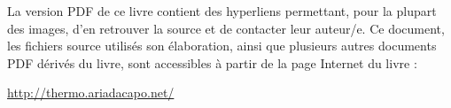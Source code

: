 {	La version PDF de ce livre contient des hyperliens permettant, pour la plupart des images, d’en retrouver la source et de contacter leur auteur/e. Ce document, les fichiers source utilisés son élaboration, ainsi que plusieurs autres documents PDF dérivés du livre, sont accessibles à partir de la page Internet du livre :

		\begin{center}\href{http://thermo.ariadacapo.net/}{http://thermo.ariadacapo.net/}\end{center}
}

